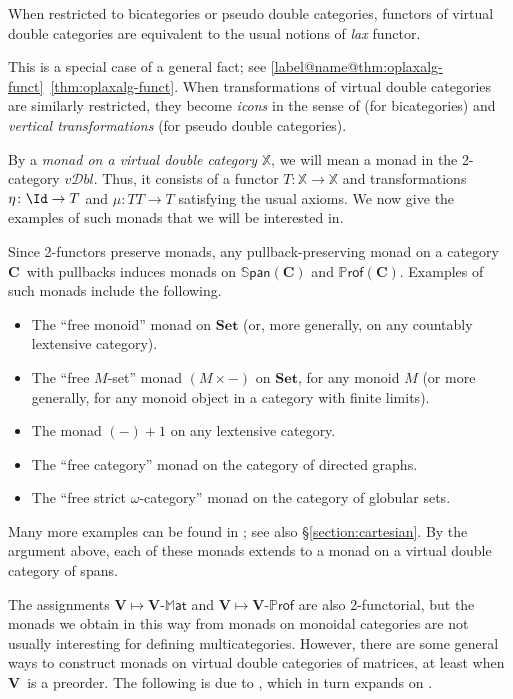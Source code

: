 \documentclass{tac}
\makeatletter
\newcommand{\V}{\ensuremath{\mathbf{V}}}
\newcommand{\C}{\ensuremath{\mathbf{C}}}
\newcommand{\mb}[1]{{\mathbf{#1}}}
\newcommand{\maps}{\colon}
\newcommand{\MAT}[1]{\mathbf{#1}\mbox{-}\mathbb{M}\mathsf{at}}
\newcommand{\PROF}[1]{\mathbf{#1}\mbox{-}\mathbb{P}\mathsf{rof}}
\newcommand{\SPAN}[1]{\mathbb{S}\mathsf{pan}\!\left(\mb{#1}\right)}
\newcommand{\iPROF}[1]{\mathbb{P}\mathsf{rof}(\mb{#1})}
\newcommand{\vDbl}{\ensuremath{\mathit{v}\mathcal{D}\mathit{bl}}}
\numberwithin{equation}{section}
\def\currthmtype{}
\def\autoref#1{\ref*{label@name@#1}~\ref{#1}}
\def\autoref#1{\ref{label@name@#1}~\ref{#1}}
\let\old@label\label
\def\label#1{%
    {\let\your@currentlabel\@currentlabel%
      \edef\@currentlabel{\currthmtype}%
      \old@label{label@name@#1}}%
    \old@label{#1}}
\newenvironment{packeditem}{%
  \begin{itemize}%
    \setlength{\itemsep}{0pt}%
    \setlength{\topsep}{0pt}%
}{\end{itemize}}
\makeatother
\begin{document}
\begin{example}
  When restricted to bicategories or pseudo double categories,
  functors of virtual double categories are equivalent to the usual
  notions of \emph{lax} functor.
  
  This is a special case of a general fact; see \autoref{thm:oplaxalg-funct}.
  When transformations of virtual double categories are similarly
  restricted, they become \emph{icons} in the sense of \cite{lack:icons}
  (for bicategories) and \emph{vertical transformations} (for pseudo
  double categories).
\end{example}

By a \emph{monad on a virtual double category} $\mathbb{X}$, we will
mean a monad in the 2-category $\vDbl$.  Thus, it consists of a
functor $T\maps \mathbb{X}\to \mathbb{X}$ and transformations
$\eta\maps \Id\to T$ and $\mu\maps TT\to T$ satisfying the usual axioms.
We now give the examples of such monads that we will be interested in.


\begin{example}\label{example:cartesian}
  Since 2-functors preserve monads, any pullback-preserving monad on a
  category \C\ with pullbacks induces monads on $\SPAN{C}$ and
  $\iPROF{C}$.
  Examples of such monads include the following.
	\begin{packeditem}
	\item The ``free monoid'' monad on $\mb{Set}$ (or, more
          generally, on any countably lextensive category).
	\item The ``free $M$-set'' monad $(M \times -)$ on $\mb{Set}$, for any monoid
          $M$ (or more generally, for any monoid object in a category
          with finite limits).
        \item The monad $(-)+1$ on any lextensive category.
	\item The ``free category'' monad on the category of directed graphs.
	\item The ``free strict $\omega$-category'' monad on the category of globular sets.
	\end{packeditem}
  Many more examples can be found in
  \cite[pp.~103--107]{leinster:higher-opds}; see also
  \S\ref{section:cartesian}.  By the argument above, each of these monads extends to a
  monad on a virtual double category of spans.
\end{example}

The assignments $\V\mapsto \MAT{V}$ and $\V\mapsto\PROF{V}$ are also
2-functorial, but the monads we obtain in this way from monads on
monoidal categories are not usually interesting for defining
multicategories.  However, there are some general ways to construct
monads on virtual double categories of matrices, at least when \V\ is
a preorder.  The following is due to \cite{SealCanonical}, which in
turn expands on \cite{OneSetting}.
\end{document}
